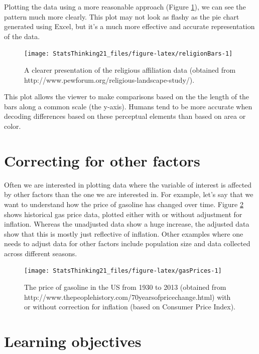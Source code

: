 \documentclass[
  12pt,
]{book}
\begin{document}
Plotting the data using a more reasonable approach (Figure \ref{fig:religionBars}), we can see the pattern much more clearly. This plot may not look as flashy as the pie chart generated using Excel, but it's a much more effective and accurate representation of the data.

\begin{figure}
\texttt{[image: StatsThinking21\_files/figure-latex/religionBars-1]} \caption{A clearer presentation of the religious affiliation data (obtained from http://www.pewforum.org/religious-landscape-study/).}\label{fig:religionBars}
\end{figure}

This plot allows the viewer to make comparisons based on the the length of the bars along a common scale (the y-axis). Humans tend to be more accurate when decoding differences based on these perceptual elements than based on area or color.

\hypertarget{correcting-for-other-factors}{%
\section{Correcting for other factors}\label{correcting-for-other-factors}}

Often we are interested in plotting data where the variable of interest is affected by other factors than the one we are interested in. For example, let's say that we want to understand how the price of gasoline has changed over time. Figure \ref{fig:gasPrices} shows historical gas price data, plotted either with or without adjustment for inflation. Whereas the unadjusted data show a huge increase, the adjusted data show that this is mostly just reflective of inflation. Other examples where one needs to adjust data for other factors include population size and data collected across different seasons.

\begin{figure}
\texttt{[image: StatsThinking21\_files/figure-latex/gasPrices-1]} \caption{The price of gasoline in the US from 1930 to 2013 (obtained from http://www.thepeoplehistory.com/70yearsofpricechange.html) with or without correction for inflation (based on Consumer Price Index).}\label{fig:gasPrices}
\end{figure}

\hypertarget{learning-objectives-3}{%
\section{Learning objectives}\label{learning-objectives-3}}
\end{document}
